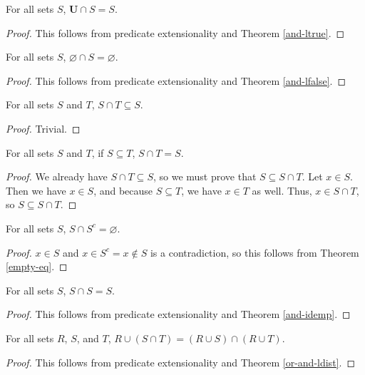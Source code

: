\documentclass[../math.tex]{subfiles}
\begin{document}
\begin{theorem} \label{inter-lid}
    For all sets $S$, $\bm U \cap S = S$.
\end{theorem}
\begin{proof}
    This follows from predicate extensionality and Theorem \ref{and-ltrue}.
\end{proof}

\begin{theorem} \label{inter-lanni}
    For all sets $S$, $\varnothing \cap S = \varnothing$.
\end{theorem}
\begin{proof}
    This follows from predicate extensionality and Theorem \ref{and-lfalse}.
\end{proof}

\begin{theorem} \label{inter-lsub}
    For all sets $S$ and $T$, $S \cap T \subseteq S$.
\end{theorem}
\begin{proof}
    Trivial.
\end{proof}

\begin{theorem} \label{lsub-inter-equal}
    For all sets $S$ and $T$, if $S \subseteq T$, $S \cap T = S$.
\end{theorem}
\begin{proof}
    We already have $S \cap T \subseteq S$, so we must prove that $S \subseteq S
    \cap T$.  Let $x \in S$.  Then we have $x \in S$, and because $S \subseteq
    T$, we have $x \in T$ as well.  Thus, $x \in S \cap T$, so $S \subseteq S
    \cap T$.
\end{proof}

\begin{theorem} \label{inter-compl-empty}
    For all sets $S$, $S \cap S^c = \varnothing$.
\end{theorem}
\begin{proof}
    $x \in S$ and $x \in S^c = x \notin S$ is a contradiction, so this follows
    from Theorem \ref{empty-eq}.
\end{proof}

\begin{theorem} \label{inter-idemp}
    For all sets $S$, $S \cap S = S$.
\end{theorem}
\begin{proof}
    This follows from predicate extensionality and Theorem \ref{and-idemp}.
\end{proof}

\begin{theorem} \label{union-ldist}
    For all sets $R$, $S$, and $T$, $R \cup (S \cap T) = (R \cup S) \cap (R \cup
    T)$.
\end{theorem}
\begin{proof}
    This follows from predicate extensionality and Theorem \ref{or-and-ldist}.
\end{proof}
\end{document}
